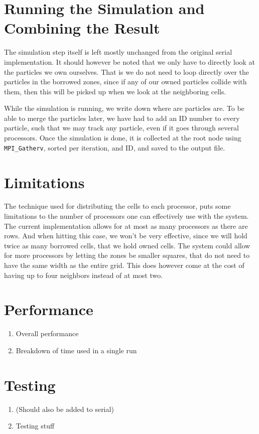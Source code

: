 \section{Running the Simulation and Combining the Result}

The simulation step itself is left mostly unchanged from the original serial implementation. It should however be noted
that we only have to directly look at the particles we own ourselves. That is we do not need to loop directly over the
particles in the borrowed zones, since if any of our owned particles collide with them, then this will be picked up when
we look at the neighboring cells.

While the simulation is running, we write down where are particles are. To be able to merge the particles later, we have
had to add an ID number to every particle, such that we may track any particle, even if it goes through several
processors. Once the simulation is done, it is collected at the root node using \verb!MPI_Gatherv!, sorted per
iteration, and ID, and saved to the output file.

\section{Limitations}

The technique used for distributing the cells to each processor, puts some limitations to the number of processors one
can effectively use with the system. The current implementation allows for at most as many processors as there are rows.
And when hitting this case, we won't be very effective, since we will hold twice as many borrowed cells, that we hold
owned cells. The system could allow for more processors by letting the zones be smaller squares, that do not need to
have the same width as the entire grid. This does however come at the cost of having up to four neighbors instead of at
most two.

\section{Performance}
\begin{enumerate}
  \item Overall performance 
  \item Breakdown of time used in a single run
\end{enumerate}

\section{Testing}
\begin{enumerate}
  \item{(Should also be added to serial)}
  \item Testing stuff
\end{enumerate}